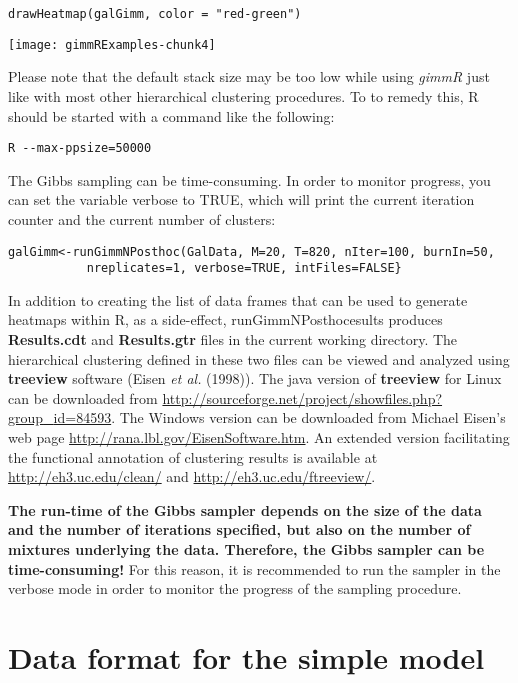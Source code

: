 \documentclass[12pt]{article}
\begin{document}
\begin{verbatim}
drawHeatmap(galGimm, color = "red-green")
\end{verbatim}

\texttt{[image: gimmRExamples-chunk4]}

Please note that the default stack size may be too low while using \textit{gimmR} just like with most other hierarchical clustering procedures. To to remedy this, R should be started with a command like the following:

\begin{verbatim}
R --max-ppsize=50000
\end{verbatim}

The Gibbs sampling can be time-consuming. In order to monitor progress, you can set the
variable verbose to TRUE, which will print the current iteration counter and the current number
of clusters:

\begin{verbatim}
galGimm<-runGimmNPosthoc(GalData, M=20, T=820, nIter=100, burnIn=50, 
           nreplicates=1, verbose=TRUE, intFiles=FALSE}
\end{verbatim}

In addition to creating the list of data frames that can be used to generate heatmaps within R, as a side-effect, 
runGimmNPosthocesults produces \textbf{Results.cdt} and \textbf{Results.gtr} files in the current working directory. 
The hierarchical clustering defined in these two files can be viewed and analyzed using \textbf{treeview} software 
(Eisen \textit{et al.} (1998)). The java version of \textbf{treeview} for Linux can be downloaded 
from \newline\underline{http://sourceforge.net/project/showfiles.php?group{\_}id=84593}. The Windows version can be downloaded from Michael Eisen's web page \newline\underline{http://rana.lbl.gov/EisenSoftware.htm}. An extended version facilitating the functional annotation
of clustering results is available at \underline{http://eh3.uc.edu/clean/} and \underline{http://eh3.uc.edu/ftreeview/}.

\textbf{The run-time of the Gibbs sampler depends on the size of the data and the number of 
iterations specified, but also on the number of mixtures underlying the data. Therefore,
the Gibbs sampler can be time-consuming!} For this reason, it is recommended to run the
sampler in the verbose mode in order to monitor the progress of the sampling procedure.

\section{Data format for the simple model}
\end{document}
